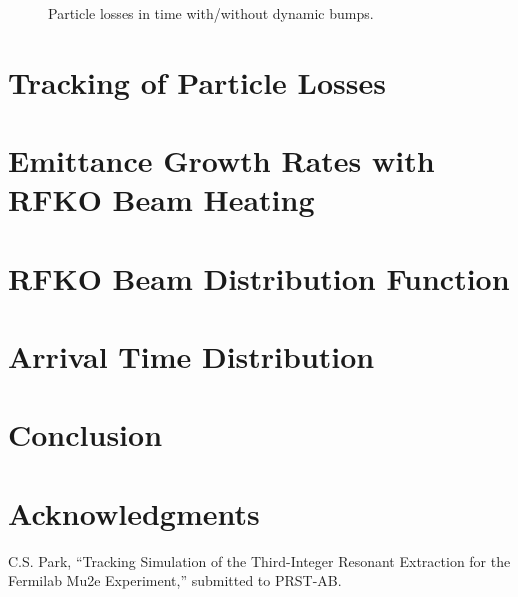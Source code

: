 \documentclass[aps,prstab,onecolumn,preprint,nofootinbib]{revtex4-1}
\begin{document}
\begin{figure}[tbh!]
  \begin{center}
    \caption{\label{fig:bump5}Particle losses in time with/without dynamic bumps.}
  \end{center}
\end{figure}

\clearpage

\section{\label{sec:loss}Tracking of Particle Losses}

\section{\label{sec:emit}Emittance Growth Rates with RFKO Beam Heating}

\section{\label{sec:rfko}RFKO Beam Distribution Function}

\section{\label{sec:arrival}Arrival Time Distribution}

\section{\label{sec:conclusion}Conclusion}

\section{\label{thanks}Acknowledgments}

\begin{thebibliography}{77}

  C.S. Park, ``Tracking Simulation of the Third-Integer Resonant Extraction for the Fermilab Mu2e Experiment,'' submitted to PRST-AB.

\end{thebibliography}
\end{document}
